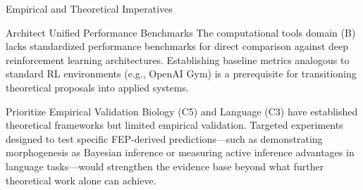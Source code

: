 \documentclass[
  ignorenonframetext,
]{beamer}
\begin{document}
\begin{frame}[allowframebreaks]{Empirical and Theoretical Imperatives}
\protect{}\label{empirical-and-theoretical-imperatives}
\begin{block}{Architect Unified Performance Benchmarks}
\protect{}\label{architect-unified-performance-benchmarks}
The computational tools domain (B) lacks standardized performance
benchmarks for direct comparison against deep reinforcement learning
architectures. Establishing baseline metrics analogous to standard RL
environments (e.g., OpenAI Gym) is a prerequisite for transitioning
theoretical proposals into applied systems.
\end{block}

\begin{block}{Prioritize Empirical Validation}
\protect{}\label{prioritize-empirical-validation}
Biology (C5) and Language (C3) have established theoretical frameworks
but limited empirical validation. Targeted experiments designed to test
specific FEP-derived predictions---such as demonstrating morphogenesis
as Bayesian inference or measuring active inference advantages in
language tasks---would strengthen the evidence base beyond what further
theoretical work alone can achieve.
\end{block}
\end{frame}
\end{document}
